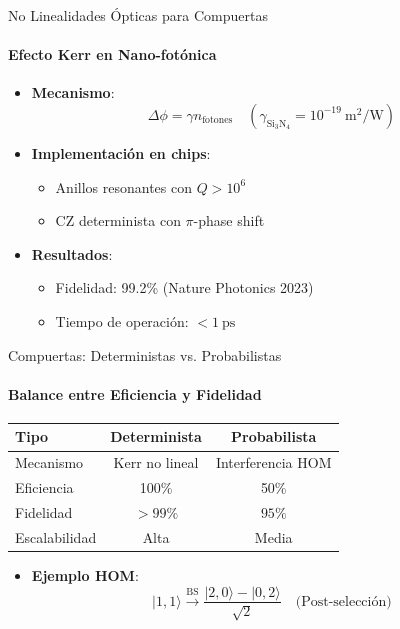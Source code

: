 \documentclass{beamer}
\begin{document}
\begin{frame}{No Linealidades Ópticas para Compuertas}
\framesubtitle{Efecto Kerr en Nano-fotónica}

\begin{itemize}
    \item \textbf{Mecanismo}:
    \[
    \Delta\phi = \gamma n_{\text{fotones}} \quad (\gamma_{\text{Si}_3\text{N}_4} = 10^{-19}\ \text{m}^2/\text{W})
    \]
    
    \item \textbf{Implementación en chips}:
    \begin{itemize}
        \item Anillos resonantes con \(Q > 10^6\)
        \item CZ determinista con \( \pi \)-phase shift
    \end{itemize}
    
    \item \textbf{Resultados}:
    \begin{itemize}
        \item Fidelidad: 99.2\% (Nature Photonics 2023)
        \item Tiempo de operación: \(<1\ \text{ps}\)
    \end{itemize}
\end{itemize}
\end{frame}

\begin{frame}{Compuertas: Deterministas vs. Probabilistas}
\framesubtitle{Balance entre Eficiencia y Fidelidad}

\begin{table}[h]
\centering
\small
\begin{tabular}{|l|c|c|}
\hline
\textbf{Tipo} & \textbf{Determinista} & \textbf{Probabilista} \\
\hline
Mecanismo & Kerr no lineal & Interferencia HOM \\
\hline
Eficiencia & 100\% & 50\% \\
\hline
Fidelidad & \(>99\%\) & \(95\%\) \\
\hline
Escalabilidad & Alta & Media \\
\hline
\end{tabular}
\end{table}

\begin{itemize}
    \item \textbf{Ejemplo HOM}:
    \[
    |1,1\rangle \xrightarrow{\text{BS}} \frac{|2,0\rangle - |0,2\rangle}{\sqrt{2}} \quad \text{(Post-selección)}
    \]
\end{itemize}
\end{frame}
\end{document}
